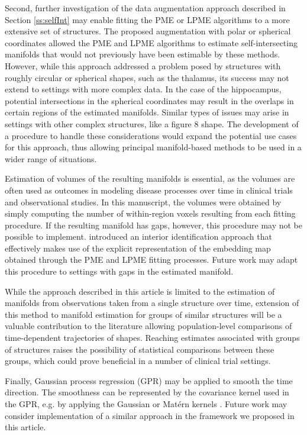 \documentclass[12pt]{article}
\theoremstyle{definition}
\begin{document}
Second, further investigation of the  data augmentation approach described in Section \ref{ss:selfInt} may enable fitting the PME or LPME algorithms to a more extensive set of structures. The proposed augmentation with polar or spherical coordinates allowed the PME and LPME algorithms to estimate self-intersecting manifolds that would not previously have been estimable by these methods. However, while this approach addressed a problem posed by structures with roughly circular or spherical shapes, such as the thalamus, its success may not extend to settings with more complex data. In the case of the hippocampus, potential intersections in the spherical coordinates may result in the overlaps in certain regions of the estimated manifolds. Similar types of issues may arise in settings with other complex structures, like a figure 8 shape. The development of a procedure to handle these considerations would expand the potential use cases for this approach, thus allowing principal manifold-based methods to be used in a wider range of situations.

Estimation of volumes of the resulting manifolds is essential, as the volumes are often used as outcomes in modeling disease processes over time in clinical trials and observational studies. In this manuscript, the volumes were obtained by simply computing the number of within-region voxels resulting from each fitting procedure. If the resulting manifold has gaps, however, this procedure may not be possible to implement. \cite{meng2021Principal} introduced an interior identification approach that effectively makes use of the explicit representation of the embedding map obtained through the PME and LPME fitting processes. Future work may adapt this procedure to settings with gaps in the estimated manifold.

While the approach described in this article is limited to the estimation of manifolds from observations taken from a single structure over time, extension of this method to manifold estimation for groups of similar structures will be a valuable contribution to the literature allowing population-level comparisons of time-dependent trajectories of shapes. Reaching estimates associated with groups of structures raises the possibility of statistical comparisons between these groups, which could prove beneficial in a number of clinical trial settings.

Finally, Gaussian process regression (GPR) may be applied to smooth the time direction. The smoothness can be represented by the covariance kernel used in the GPR, e.g. by applying the Gaussian or Matérn kernels \citep{li2023inference}. Future work may consider implementation of a similar approach in the framework we proposed in this article.
\end{document}
